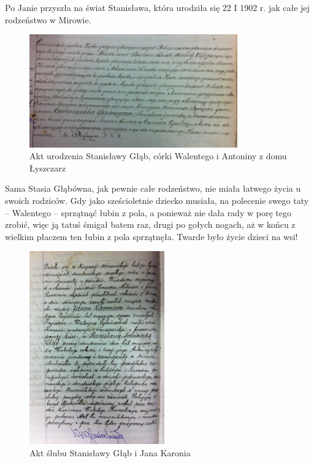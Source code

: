 Po Janie przyszła na świat Stanisława, która urodziła się 22 I 1902 r. jak całe jej rodzeństwo w Mirowie. 

\begin{figure}[!h]
\begin{center}
\includegraphics[width=0.8\textwidth]{zdjecia/akt_urodzenia_stanislawy_glab.jpg}
\caption[Akt urodzenia Stanisławy Głąb]{Akt urodzenia Stanisławy Głąb, córki Walentego i Antoniny z domu Łyszczarz}
\label{rys:akt_urodzenia_stanislawy_glab}
\end{center}
\end{figure}

Sama Stasia Głąbówna, jak pewnie całe rodzeństwo, nie miała łatwego życia u swoich rodziców. Gdy jako sześcioletnie dziecko musiała, na polecenie swego taty -- Walentego -- sprzątnąć łubin z pola, a ponieważ nie dała rady w porę tego zrobić, więc ją tatuś śmigał batem raz, drugi po gołych nogach, aż w końcu z wielkim płaczem ten łubin z pola sprzątnęła. Twarde było życie dzieci na wsi!

\begin{figure}[!ht]
\begin{center}
\includegraphics[width=0.52\textwidth]{zdjecia/akt_slubu_stanislawy_i_jana_karoniow.jpg}
\caption{Akt ślubu Stanisławy Głąb i Jana Karonia}
\label{rys:akt_slubu_stanislawy_i_jana_karoniow}
\end{center}
\end{figure}

